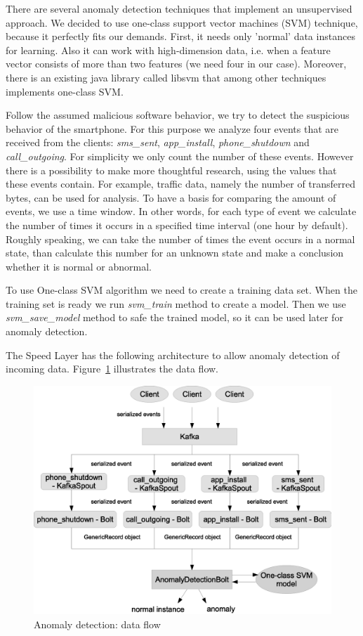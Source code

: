 There are several anomaly detection techniques that implement an unsupervised approach.
We decided to use one-class support vector machines (SVM) technique, because it perfectly fits our demands.
First, it needs only 'normal' data instances for learning.
Also it can work with high-dimension data, i.e. when a feature vector consists of more than two features (we need four in our case).
Moreover, there is an existing java library called libsvm \cite{libsvm} that among other techniques implements one-class SVM.

Follow the assumed malicious software behavior, we try to detect the suspicious behavior of the smartphone.
For this purpose we analyze four events that are received from the clients: \textit{sms\_sent}, \textit{app\_install}, \textit{phone\_shutdown} and \textit{call\_outgoing}.
For simplicity we only count the number of these events.
However there is a possibility to make more thoughtful research, using the values that these events contain.
For example, traffic data, namely the number of transferred bytes, can be used for analysis.
To have a basis for comparing the amount of events, we use a time window.
In other words, for each type of event we calculate the number of times it occurs in a specified time interval (one hour by default).
Roughly speaking, we can take the number of times the event occurs in a normal state, than calculate this number for an unknown state and make a conclusion whether it is normal or abnormal.

To use One-class SVM algorithm we need to create a training data set.
When the training set is ready we run \textit{svm\_train} method to create a model.
Then we use \textit{svm\_save\_model} method to safe the trained model, so it can be used later for anomaly detection.

The Speed Layer has the following architecture to allow anomaly detection of incoming data.
Figure~\ref{fig:anomaly_detection_data_flow} illustrates the data flow.

\begin{figure}[h]
  \centering
  \includegraphics [width=1.0\textwidth]{images/anomaly_detection_data_flow}
  \caption{Anomaly detection: data flow}
  \label{fig:anomaly_detection_data_flow}
\end{figure}

